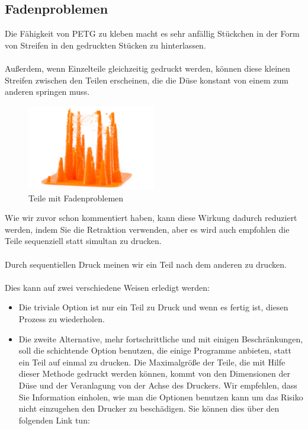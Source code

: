 \documentclass[11pt,a4paper]{article}
\begin{document}
	\subsection{Fadenproblemen}Die Fähigkeit von PETG zu kleben macht es sehr anfällig Stückchen in der Form von Streifen in den gedruckten Stücken zu hinterlassen.
\\\\
Außerdem, wenn Einzelteile gleichzeitig gedruckt werden, können diese kleinen Streifen zwischen den Teilen erscheinen, die die Düse konstant von einem zum anderen springen muss.
\begin{figure}[H]
\centering
\includegraphics[width=0.5\textwidth,cfbox=azul_marcos 1pt 0pt]{FOTOS/RETRACCION1}
\caption*{Teile mit Fadenproblemen}
\end{figure}
Wie wir zuvor schon kommentiert haben, kann diese Wirkung dadurch reduziert werden, indem Sie die Retraktion verwenden, aber es wird auch empfohlen die Teile sequenziell statt simultan zu drucken.
\\\\
Durch sequentiellen Druck meinen wir ein Teil nach dem anderen zu drucken. 
\\\\
Dies kann auf zwei verschiedene Weisen erledigt werden: 
\begin{itemize}
\item Die triviale Option ist nur ein Teil zu Druck und wenn es fertig ist, diesen Prozess zu wiederholen. 
\item Die zweite Alternative, mehr fortschrittliche und mit einigen Beschränkungen, soll die schichtende Option benutzen, die einige Programme anbieten, statt ein Teil auf einmal zu drucken. Die Maximalgröße der Teile, die mit Hilfe dieser Methode gedruckt werden können, kommt von den Dimensionen der Düse und der Veranlagung von der Achse des Druckers. Wir empfehlen, dass Sie Information einholen, wie man die Optionen benutzen kann um das Risiko nicht einzugehen den Drucker zu beschädigen. Sie können dies über den folgenden Link tun: 
\end{itemize}
\end{document}
